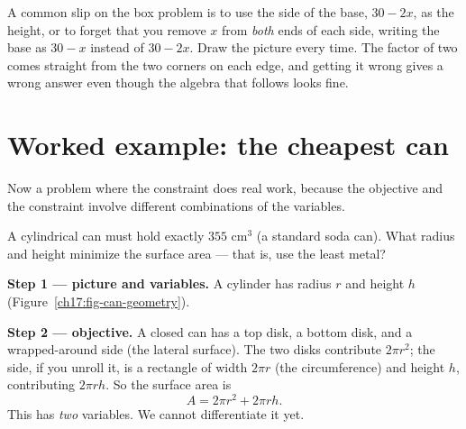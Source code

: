 \begin{trapbox}
A common slip on the box problem is to use the side of the base, $30-2x$, as the
height, or to forget that you remove $x$ from \emph{both} ends of each side, writing
the base as $30-x$ instead of $30-2x$. Draw the picture every time. The factor of two
comes straight from the two corners on each edge, and getting it wrong gives a wrong
answer even though the algebra that follows looks fine.
\end{trapbox}

\section{Worked example: the cheapest can}

Now a problem where the constraint does real work, because the objective and
the constraint involve different combinations of the variables.

\begin{example}\label{ch17:ex-can}
A cylindrical can must hold exactly $355$ cm$^3$ (a standard soda can). What radius
and height minimize the surface area --- that is, use the least metal?
\end{example}

\textbf{Step 1 --- picture and variables.} A cylinder has radius $r$ and height $h$
(Figure~\ref{ch17:fig-can-geometry}).

\textbf{Step 2 --- objective.} A closed can has a top disk, a bottom disk, and a
wrapped-around side (the lateral surface). The two disks contribute $2\pi r^2$; the
side, if you unroll it, is a rectangle of width $2\pi r$ (the circumference) and
height $h$, contributing $2\pi r h$. So the surface area is
\[
A = 2\pi r^2 + 2\pi r h.
\]
This has \emph{two} variables. We cannot differentiate it yet.

